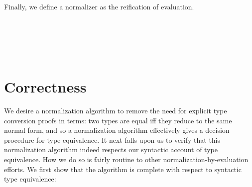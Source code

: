 \documentclass[authoryear, acmsmall, screen, review, nonacm]{acmart}
\begin{document}
Finally, we define a normalizer as the reification of evaluation.

\begin{code}%
\>[0]\AgdaSpace{}%
\AgdaSymbol{:}\AgdaSpace{}%
\AgdaSpace{}%
\AgdaSymbol{\{}\AgdaSymbol{\}}\AgdaSpace{}%
\AgdaSpace{}%
\AgdaSpace{}%
\AgdaSpace{}%
\AgdaSpace{}%
\AgdaSpace{}%
\AgdaSpace{}%
\AgdaSpace{}%
\<%
\\
\>[0]\AgdaSpace{}%
\AgdaSpace{}%
\AgdaSymbol{=}\AgdaSpace{}%
\AgdaSpace{}%
\AgdaSymbol{(}\AgdaSpace{}%
\AgdaSpace{}%
\AgdaSymbol{)}\<%
\\
%
\\[\AgdaEmptyExtraSkip]%
\>[0]\AgdaSpace{}%
\AgdaSymbol{:}\AgdaSpace{}%
\AgdaSpace{}%
\AgdaSymbol{\{}\AgdaSymbol{\}}\AgdaSpace{}%
\AgdaSpace{}%
\AgdaSpace{}%
\AgdaSpace{}%
\AgdaSpace{}%
\AgdaSpace{}%
\AgdaSpace{}%
\AgdaSpace{}%
\<%
\\
\>[0]\AgdaSpace{}%
\AgdaSpace{}%
\AgdaSymbol{=}\AgdaSpace{}%
\AgdaSpace{}%
\AgdaSymbol{(}\AgdaSpace{}%
\AgdaSymbol{(}\AgdaSpace{}%
\AgdaSymbol{)}\AgdaSpace{}%
\AgdaSymbol{)}\<%
\end{code}

\section{Correctness}

We desire a normalization algorithm to remove the need for explicit type conversion proofs in terms: two types are equal iff they reduce to the same normal form, and so a normalization algorithm effectively gives a decision procedure for type equivalence. It next falls upon us to verify that this normalization algorithm indeed respects our syntactic account of type equivalence. How we do so is fairly routine to other normalization-by-evaluation efforts. We first show that the algorithm is complete with respect to syntactic type equivalence:
\end{document}
